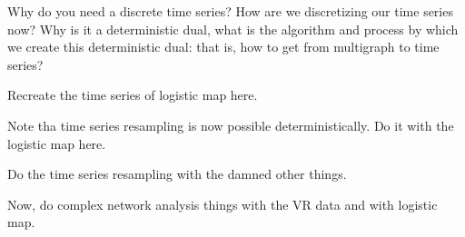 \documentclass[12pt]{article}
\begin{document}
Why do you need a discrete time series? How are we discretizing our time series now? Why is it a deterministic dual, what is the algorithm and process by which we create this deterministic dual: that is, how to get from multigraph to time series?

Recreate the time series of logistic map here.

Note tha time series resampling is now possible deterministically. Do it with the logistic map here.

Do the time series resampling with the damned other things.

Now, do complex network analysis things with the VR data and with logistic map.
\end{document}
